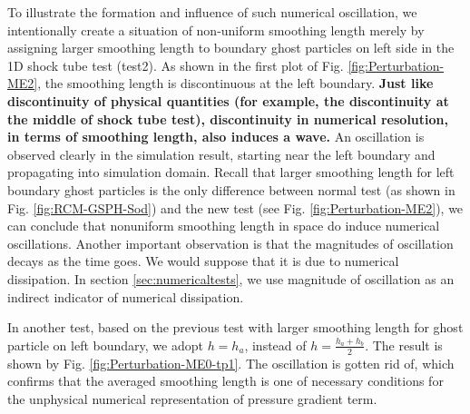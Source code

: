 \documentclass[preprint,12pt,authoryear]{elsarticle}
\begin{document}
To illustrate the formation and influence of such numerical oscillation, we intentionally create a situation of non-uniform smoothing length merely by assigning larger smoothing length to boundary ghost particles on left side in the 1D shock tube test (test2). As shown in the first plot of Fig. \ref{fig:Perturbation-ME2}, the smoothing length is discontinuous at the left boundary. \textbf{Just like discontinuity of physical quantities (for example, the discontinuity at the middle of shock tube test), discontinuity in numerical resolution, in terms of smoothing length, also induces a wave.} An oscillation is observed clearly in the simulation result, starting near the left boundary and propagating into simulation domain. Recall that larger smoothing length for left boundary ghost particles is the only difference between normal test (as shown in Fig. \ref{fig:RCM-GSPH-Sod}) and the new test (see Fig. \ref{fig:Perturbation-ME2}), we can conclude that nonuniform smoothing length in space do induce numerical oscillations.  Another important observation is that the magnitudes of oscillation decays as the time goes. We would suppose that it is due to numerical dissipation. In section \ref{sec:numericaltests}, we use magnitude of oscillation as an indirect indicator of numerical dissipation.

In another test, based on the previous test with larger smoothing length for ghost particle on left boundary, we adopt $h = h_a$, instead of $h = \frac{h_a + h_b}{2}$. The result is shown by Fig. \ref{fig:Perturbation-ME0-tp1}. The oscillation is gotten rid of, which confirms that the averaged smoothing length is one of necessary conditions for the unphysical numerical representation of pressure gradient term.
\end{document}
